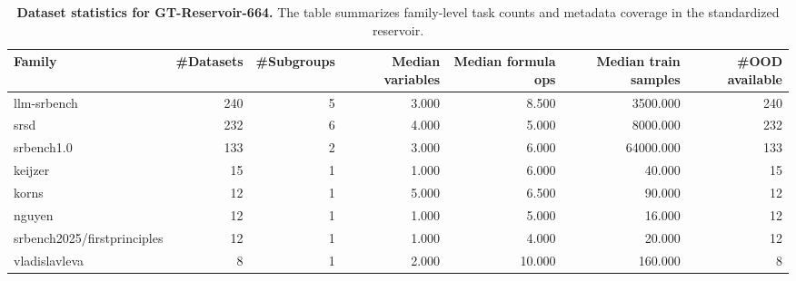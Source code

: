 \begin{table}
\caption{\textbf{Dataset statistics for GT-Reservoir-664.} The table summarizes family-level task counts and metadata coverage in the standardized reservoir.}
\label{tab:table01_dataset_reservoir_stats}
\begin{tabular}{lrrrrrr}
\toprule
\textbf{Family} & \textbf{\#Datasets} & \textbf{\#Subgroups} & \textbf{Median variables} & \textbf{Median formula ops} & \textbf{Median train samples} & \textbf{\#OOD available} \\
\midrule
llm-srbench & 240 & 5 & 3.000 & 8.500 & 3500.000 & 240 \\
srsd & 232 & 6 & 4.000 & 5.000 & 8000.000 & 232 \\
srbench1.0 & 133 & 2 & 3.000 & 6.000 & 64000.000 & 133 \\
keijzer & 15 & 1 & 1.000 & 6.000 & 40.000 & 15 \\
korns & 12 & 1 & 5.000 & 6.500 & 90.000 & 12 \\
nguyen & 12 & 1 & 1.000 & 5.000 & 16.000 & 12 \\
srbench2025/firstprinciples & 12 & 1 & 1.000 & 4.000 & 20.000 & 12 \\
vladislavleva & 8 & 1 & 2.000 & 10.000 & 160.000 & 8 \\
\bottomrule
\end{tabular}
\end{table}
